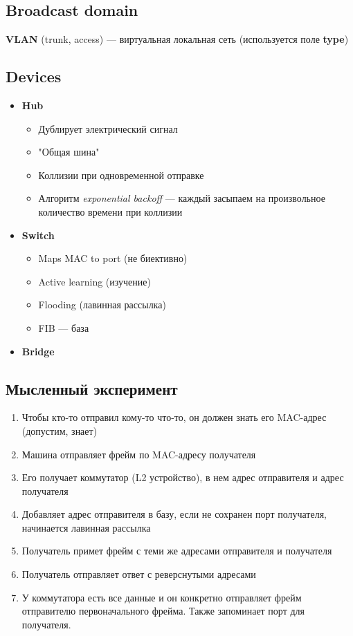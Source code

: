\documentclass[../../lectures.tex]{subfiles}
\begin{document}
\subsection{Broadcast domain}
\textbf{VLAN} (trunk, access) --- виртуальная локальная сеть (используется поле \textbf{type})

\subsection{Devices}
\begin{itemize}
    \item \textbf{Hub}
        \begin{itemize}
            \item Дублирует электрический сигнал
            \item "Общая шина"
            \item Коллизии при одновременной отправке
            \item Алгоритм \emph{exponential backoff} --- каждый засыпаем на произвольное количество времени при коллизии
        \end{itemize}
    \item \textbf{Switch}
        \begin{itemize}
            \item Maps MAC to port (не биективно)
            \item Active learning (изучение)
            \item Flooding (лавинная рассылка)
            \item FIB --- база
        \end{itemize}
    \item \textbf{Bridge}
\end{itemize}

\subsection{Мысленный эксперимент}
\begin{enumerate}
    \item Чтобы кто-то отправил кому-то что-то, он должен знать его MAC-адрес (допустим, знает)
    \item Машина отправляет фрейм по MAC-адресу получателя
    \item Его получает коммутатор (L2 устройство), в нем адрес отправителя и адрес получателя
    \item Добавляет адрес отправителя в базу, если не сохранен порт получателя, начинается лавинная рассылка
    \item Получатель примет фрейм с теми же адресами отправителя и получателя
    \item Получатель отправляет ответ с реверснутыми адресами
    \item У коммутатора есть все данные и он конкретно отправляет фрейм отправителю первоначального фрейма. Также запоминает порт для получателя.
\end{enumerate}
\end{document}
